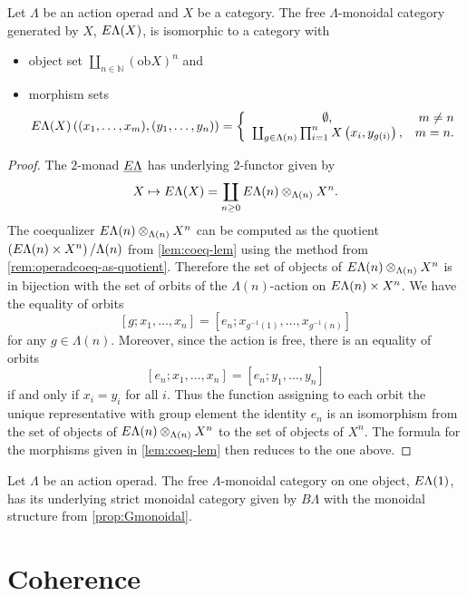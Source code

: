 \begin{prop}\label{prop:hom-set-lemma}
Let $\Lambda$ be an action operad and $X$ be a category. The free $\Lambda$-monoidal category generated by $X$, $E\Lambda(X)$, is isomorphic to a category with
\begin{itemize}
\item object set $\coprod_{n \in \mathbb{N}} (\textrm{ob} X)^n$ and
\item morphism sets
\[
E\Lambda(X)\left( (x_1, \ldots, x_m), (y_1, \ldots, y_n) \right) = \left\{ \begin{array}{cr} \emptyset, & m \neq n \\
\coprod_{g \in \Lambda(n)} \prod_{i=1}^{n} X\left(x_i, y_{g(i)}\right), & m=n. \end{array} \right.
\]
\end{itemize}
\end{prop}
\begin{proof}
The $2$-monad $\underline{E\Lambda}$ has underlying 2-functor given by
  \[
    X \mapsto E\Lambda(X) = \coprod_{n \geq 0} E\Lambda(n) \otimes_{\Lambda(n)} X^{n}.
  \]
The coequalizer $E\Lambda(n) \otimes_{\Lambda(n)} X^{n}$ can be computed as the quotient $\left( E\Lambda(n) \times X^n \right)/\Lambda(n)$ from \cref{lem:coeq-lem} using the method from \cref{rem:operadcoeq-as-quotient}.
Therefore the set of objects of $E\Lambda(n) \otimes_{\Lambda(n)} X^{n}$ is in bijection with the set of orbits of the $\Lambda(n)$-action on $E\Lambda(n) \times X^n$. We have the equality of orbits
\[
[g; x_{1}, \ldots, x_n] = [e_n; x_{g^{-1}(1)}, \ldots, x_{g^{-1}(n)}]
\]
for any $g \in \Lambda(n)$. Moreover, since the action is free, there is an equality of orbits
\[
[e_n; x_1, \ldots, x_n] = [e_n; y_1, \ldots, y_n]
\]
if and only if $x_i = y_i$ for all $i$. Thus the function assigning to each orbit the unique representative with group element the identity $e_n$ is an isomorphism from the set of objects of $E\Lambda(n) \otimes_{\Lambda(n)} X^{n}$ to the set of objects of $X^n$. The formula for the morphisms given in \cref{lem:coeq-lem} then reduces to the one above.
\end{proof}

\begin{cor}\label{cor:el1=bl}
Let $\Lambda$ be an action operad. The free $\Lambda$-monoidal category on one object, $E\Lambda(1)$, has its underlying strict monoidal category given by $B\Lambda$ with the monoidal structure from \cref{prop:Gmonoidal}.
\end{cor}

\section{Coherence}\label{sec:coherence}

